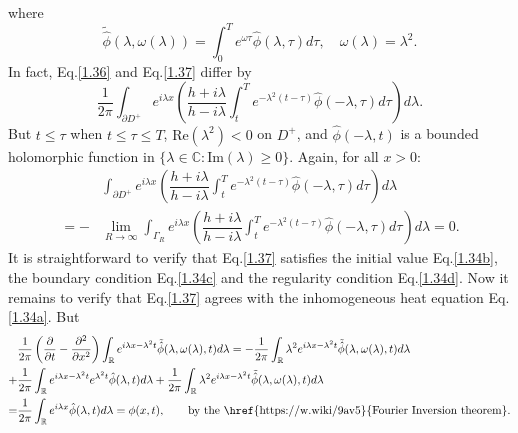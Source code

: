 \documentclass[12pt]{article}
\numberwithin{equation}{section}
\begin{document}
where
\begin{equation*}
    \tilde{\hat{\phi}}(\lambda,\omega(\lambda))=\int_{0}^{T} e^{\omega\tau} \hat{\phi}(\lambda,\tau)d\tau,\quad \omega(\lambda)=\lambda^2.
\end{equation*}
In fact, Eq.\eqref{1.36} and Eq.\eqref{1.37} differ by 
\begin{equation}\label{1.38}
    \dfrac{1}{2\pi}\int_{\partial D^+}e^{i\lambda x}\left(\dfrac{h+i\lambda}{h-i\lambda}\int_{t}^{T}e^{-\lambda^2 (t-\tau)}\hat{\phi}(-\lambda,\tau)d\tau\right)d\lambda.
\end{equation}
But $t\leqslant \tau$ when $t\leqslant\tau\leqslant T$, $\text{Re}(\lambda^2)<0$ on $D^+$, and $\hat{\phi}(-\lambda,t)$ is a bounded holomorphic function in $\{\lambda\in\mathbb{C}:\text{Im}(\lambda)\geqslant 0\}$. Again, for all $x>0$:
\begin{equation}\label{1.39}
    \begin{split}
    &\int_{\partial D^+}e^{i\lambda x}\left(\dfrac{h+i\lambda}{h-i\lambda}\int_{t}^{T}e^{-\lambda^2 (t-\tau)}\hat{\phi}(-\lambda,\tau)d\tau\right)d\lambda\\
    =-&\lim\limits_{R\to\infty}\int_{\Gamma_{R}}e^{i\lambda x}\left(\dfrac{h+i\lambda}{h-i\lambda}\int_{t}^{T}e^{-\lambda^2 (t-\tau)}\hat{\phi}(-\lambda,\tau)d\tau\right)d\lambda=0.
    \end{split}
\end{equation}
It is straightforward to verify that Eq.\eqref{1.37} satisfies the initial value Eq.\eqref{1.34b}, the boundary condition Eq.\eqref{1.34c} and the regularity condition Eq.\eqref{1.34d}.
Now it remains to verify that Eq.\eqref{1.37} agrees with the inhomogeneous heat equation Eq.\eqref{1.34a}. But
\begin{equation*}
    \begin{split}
        &\dfrac{1}{2\pi}\left(\dfrac{\partial}{\partial t}-\dfrac{\partial^2}{\partial x^2}\right)\int_{\mathbb{R}} e^{i\lambda x-\lambda^2 t}\tilde{\hat{\phi}}(\lambda,\omega(\lambda),t)d\lambda=-\dfrac{1}{2\pi}\int_{\mathbb{R}} \lambda^2 e^{i\lambda x-\lambda^2 t}\tilde{\hat{\phi}}(\lambda,\omega(\lambda),t)d\lambda\\
        +&\dfrac{1}{2\pi}\int_{\mathbb{R}} e^{i\lambda x-\lambda^2 t} e^{\lambda^2 t} \hat{\phi}(\lambda,t) d\lambda+\dfrac{1}{2\pi}\int_{\mathbb{R}} \lambda^2 e^{i\lambda x-\lambda^2 t}\tilde{\hat{\phi}}(\lambda,\omega(\lambda),t)d\lambda\\
        =&\dfrac{1}{2\pi}\int_{\mathbb{R}} e^{i\lambda x} \hat{\phi}(\lambda,t)d\lambda=\phi(x,t),\qquad \text{by the \href{https://w.wiki/9av5}{Fourier Inversion theorem}.}
    \end{split}
\end{equation*}
\end{document}
